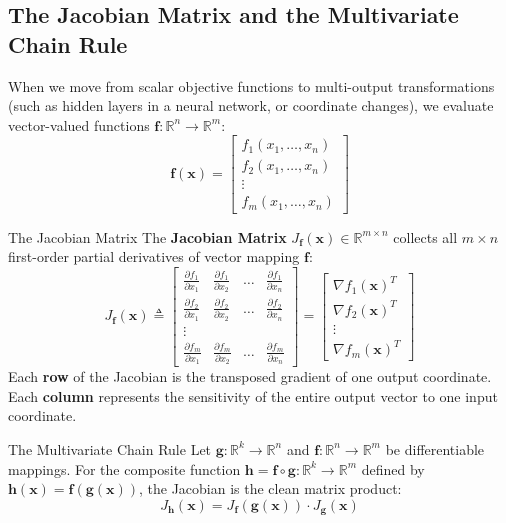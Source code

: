 \subsection{The Jacobian Matrix and the Multivariate Chain Rule}
When we move from scalar objective functions to multi-output transformations (such as hidden layers in a neural network, or coordinate changes), we evaluate vector-valued functions $\mathbf{f}: \mathbb{R}^n \to \mathbb{R}^m$:
\begin{equation}
\mathbf{f}(\mathbf{x}) = \begin{bmatrix} f_1(x_1, \dots, x_n) \\ f_2(x_1, \dots, x_n) \\ \vdots \\ f_m(x_1, \dots, x_n) \end{bmatrix}
\end{equation}

\begin{definitionbox}{The Jacobian Matrix}
The \textbf{Jacobian Matrix} $J_{\mathbf{f}}(\mathbf{x}) \in \mathbb{R}^{m \times n}$ collects all $m \times n$ first-order partial derivatives of vector mapping $\mathbf{f}$:
\begin{equation}
J_{\mathbf{f}}(\mathbf{x}) \triangleq \begin{bmatrix}
\frac{\partial f_1}{\partial x_1} & \frac{\partial f_1}{\partial x_2} & \dots & \frac{\partial f_1}{\partial x_n} \\
\frac{\partial f_2}{\partial x_1} & \frac{\partial f_2}{\partial x_2} & \dots & \frac{\partial f_2}{\partial x_n} \\
\vdots \\
\frac{\partial f_m}{\partial x_1} & \frac{\partial f_m}{\partial x_2} & \dots & \frac{\partial f_m}{\partial x_n}
\end{bmatrix} = \begin{bmatrix}
\nabla f_1(\mathbf{x})^T \\
\nabla f_2(\mathbf{x})^T \\
\vdots \\
\nabla f_m(\mathbf{x})^T
\end{bmatrix}
\label{eq:jacobian_def}
\end{equation}
Each \textbf{row} of the Jacobian is the transposed gradient of one output coordinate. Each \textbf{column} represents the sensitivity of the entire output vector to one input coordinate.
\end{definitionbox}

\begin{theorembox}{The Multivariate Chain Rule}
Let $\mathbf{g}: \mathbb{R}^k \to \mathbb{R}^n$ and $\mathbf{f}: \mathbb{R}^n \to \mathbb{R}^m$ be differentiable mappings. For the composite function $\mathbf{h} = \mathbf{f} \circ \mathbf{g}: \mathbb{R}^k \to \mathbb{R}^m$ defined by $\mathbf{h}(\mathbf{x}) = \mathbf{f}(\mathbf{g}(\mathbf{x}))$, the Jacobian is the clean matrix product:
\begin{equation}
J_{\mathbf{h}}(\mathbf{x}) = J_{\mathbf{f}}(\mathbf{g}(\mathbf{x})) \cdot J_{\mathbf{g}}(\mathbf{x})
\label{eq:chain_rule_matrix_prod}
\end{equation}
\end{theorembox}

